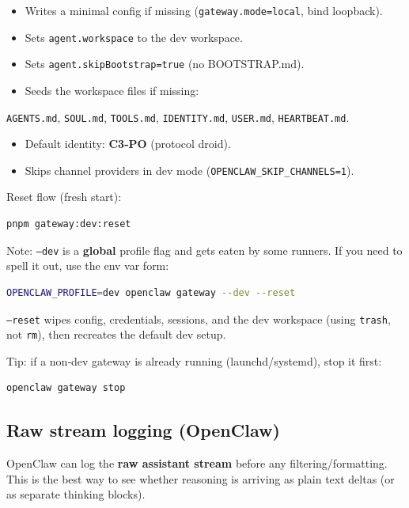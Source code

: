 \begin{itemize}
  \item Writes a minimal config if missing (\texttt{gateway.mode=local}, bind loopback).
  \item Sets \texttt{agent.workspace} to the dev workspace.
  \item Sets \texttt{agent.skipBootstrap=true} (no BOOTSTRAP.md).
  \item Seeds the workspace files if missing:
\end{itemize}

\texttt{AGENTS.md}, \texttt{SOUL.md}, \texttt{TOOLS.md}, \texttt{IDENTITY.md}, \texttt{USER.md}, \texttt{HEARTBEAT.md}.
\begin{itemize}
  \item Default identity: \textbf{C3‑PO} (protocol droid).
  \item Skips channel providers in dev mode (\texttt{OPENCLAW\_SKIP\_CHANNELS=1}).
\end{itemize}


Reset flow (fresh start):

\begin{lstlisting}[language=bash]
pnpm gateway:dev:reset
\end{lstlisting}


Note: \texttt{--dev} is a \textbf{global} profile flag and gets eaten by some runners.
If you need to spell it out, use the env var form:

\begin{lstlisting}[language=bash]
OPENCLAW_PROFILE=dev openclaw gateway --dev --reset
\end{lstlisting}


\texttt{--reset} wipes config, credentials, sessions, and the dev workspace (using
\texttt{trash}, not \texttt{rm}), then recreates the default dev setup.

Tip: if a non‑dev gateway is already running (launchd/systemd), stop it first:

\begin{lstlisting}[language=bash]
openclaw gateway stop
\end{lstlisting}


\subsection{Raw stream logging (OpenClaw)}


OpenClaw can log the \textbf{raw assistant stream} before any filtering/formatting.
This is the best way to see whether reasoning is arriving as plain text deltas
(or as separate thinking blocks).

